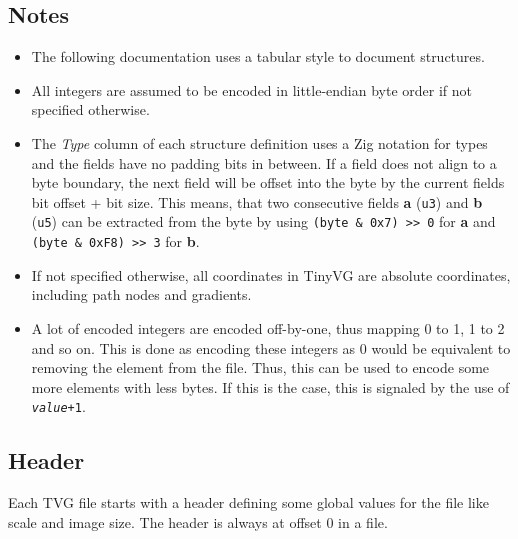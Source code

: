 \documentclass[]{article}
\begin{document}
\hypertarget{binary-notes}{\subsection{Notes}\label{binary-notes}}

\begin{itemize}
\item The following documentation uses a tabular style to document structures.
\item All integers are assumed to be encoded in little-endian byte order if not specified otherwise. 
\item The \emph{Type} column of each structure definition uses a Zig notation for types and the fields
      have no padding bits in between. If a field does not align to a byte boundary, the next field will
      be offset into the byte by the current fields bit offset + bit size. This means, that two consecutive
      fields \textbf{a} (\texttt{u3}) and \textbf{b} (\texttt{u5}) can be extracted from the byte by using
      \texttt{(byte\ \&\ 0x7)\ \textgreater{}\textgreater{}\ 0} for \textbf{a} and \texttt{(byte\ \&\ 0xF8)\ \textgreater{}\textgreater{}\ 3}
      for \textbf{b}.
\item If not specified otherwise, all coordinates in TinyVG are absolute coordinates, including path nodes and gradients.
\item A lot of encoded integers are encoded off-by-one, thus mapping 0 to 1, 1 to 2 and so on. This is done as encoding these integers as 0 would be equivalent to removing the element from the file. Thus, this can be used to encode some more elements with less bytes. If this is the case, this is signaled by the use of \texttt{\textit{value}+1}.
\end{itemize}

\hypertarget{header}{\subsection{Header}\label{header}}

Each TVG file starts with a header defining some global values for the
file like scale and image size. The header is always at offset 0 in a
file.
\end{document}
